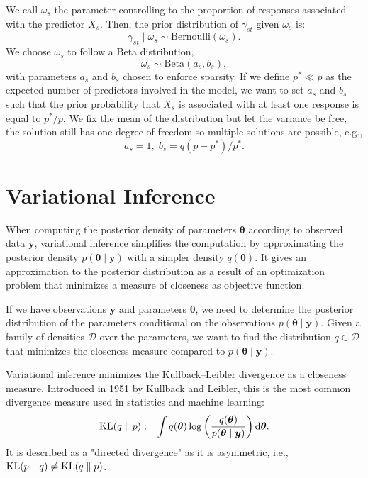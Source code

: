 \documentclass[a4paper, 11pt]{report}
\numberwithin{equation}{section}
\DeclareMathOperator*{\KL}{{\rm KL}}
\begin{document}
We call $\omega_s$ the parameter controlling to the proportion of responses associated with the predictor $X_s$. Then, the prior distribution of $\gamma_{st}$ given $\omega_s$ is:
\begin{equation*}
\gamma_{st} \mid \omega_s \sim  \text{Bernoulli}(\omega_s).
\end{equation*}
We choose $\omega_s$ to follow a Beta distribution,
\begin{equation*}
\omega_s \sim \text{Beta}(a_s, b_s),
\end{equation*}
with parameters $a_s$ and $b_s$ chosen to enforce sparsity. If we define $p^* \ll p$ as the expected number of predictors involved in the model, we want to set $a_s$ and $b_s$ such that the prior probability that $X_s$ is associated with at least one response is equal to $p^*/p$. We fix the mean of the distribution but let the variance be free, the solution still has one degree of freedom so multiple solutions are possible, e.g.,
\begin{equation*}
a_s = 1,\;b_s = q(p-p^*)/p^*.
\end{equation*}
\newpage
\chapter{Variational Inference}
When computing the posterior density of parameters $\boldsymbol{\theta}$ according to observed data $\boldsymbol{y}$, variational inference simplifies the computation by approximating the posterior density $p(\boldsymbol{\theta}\mid \boldsymbol{y})$ with a simpler density $q(\boldsymbol{\theta})$. It gives an approximation to the posterior distribution as a result of an optimization problem that minimizes a measure of closeness as objective function.

If we have observations $\boldsymbol{y}$ and parameters $\boldsymbol{\theta}$, we need to determine the posterior distribution of the parameters conditional on the observations $p(\boldsymbol{\theta} \mid \boldsymbol{y})$. Given a family of densities $\mathcal{D}$ over the parameters, we want to find the distribution $q \in \mathcal{D}$ that minimizes the closeness measure compared to $p(\boldsymbol{\theta} \mid \boldsymbol{y})$.

Variational inference minimizes the Kullback--Leibler divergence as a closeness measure. Introduced in 1951 by Kullback and Leibler\cite{kl51}, this is the most common divergence measure used in statistics and machine learning:
\begin{equation*}
\KL(q\parallel p) := \int q(\boldsymbol{\theta})\log \left(\frac{q(\boldsymbol{\theta})}{p(\boldsymbol{\theta} \mid \boldsymbol{y})}\right) \mathrm{d}\boldsymbol{\theta}.
\end{equation*} 
It is described as a "directed divergence" as it is asymmetric, i.e., $\KL(p\parallel q) \neq \KL(q \parallel p)$.
\end{document}
